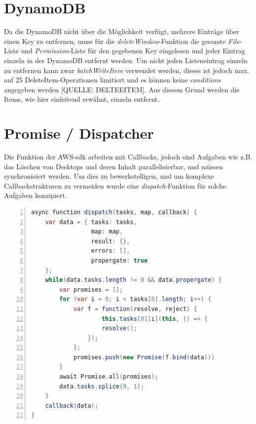 \documentclass[a4paper, 12pt]{scrreprt}
\begin{document}
\section{DynamoDB}
Da die DynamoDB nicht über die Möglichkeit verfügt, mehrere Einträge über einen Key zu entfernen, muss für die \textit{deleteWindow}-Funktion die gesamte \textit{File}-Liste und \textit{Permission}-Liste für den gegebenen Key eingelesen und jeder Eintrag einzeln in der DynamoDB entfernt werden.
Um nicht jeden Listeneintrag einzeln zu entfernen kann zwar \textit{batchWriteItem} verwendet werden, dieses ist jedoch max. auf 25 DeleteItem-Operationen limitiert und es können keine \textit{conditions} angegeben werden [QUELLE: DELTEEITEM]. Aus diesem Grund werden die Items, wie hier einleitend erwähnt, einzeln entfernt.


\section{Promise / Dispatcher}


Die Funktion der AWS-sdk arbeiten mit Callbacks, jedoch sind Aufgaben wie z.B. das Löschen von Desktops und deren Inhalt parallelisierbar, und müssen synchronisiert werden. Um dies zu bewerkstelligen, und um komplexe Callbackstrukturen zu vermeiden wurde eine \textit{dispatch}-Funktion für solche Aufgaben konzipiert. 

\begin{lstlisting}[xleftmargin=\parindent,numbers=left,numberstyle=\small,numbersep=8pt,frame=L,mathescape=true, basicstyle=\small, language=Java, lineskip={1.0pt}]
async function dispatch(tasks, map, callback) {
    var data = { tasks: tasks,
                 map: map, 
                 result: {}, 
                 errors: [], 
                 propergate: true 
    };
    while(data.tasks.length != 0 && data.propergate) {
        var promises = [];
        for (var i = 0; i < tasks[0].length; i++) {
            var f = function(resolve, reject) {
                    this.tasks[0][i](this, () => {
                    resolve();
                });
            };
            promises.push(new Promise(f.bind(data)))
        }
        await Promise.all(promises);
        data.tasks.splice(0, 1);
    }
    callback(data);
}
\end{lstlisting}
\end{document}
